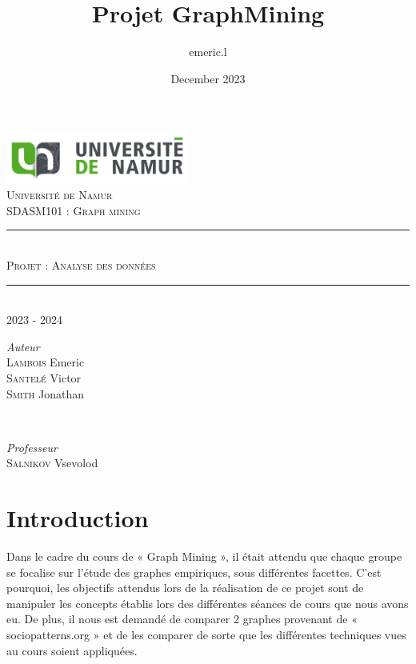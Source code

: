 \documentclass{article}
\title{Projet GraphMining}
\author{emeric.l }
\date{December 2023}
\begin{document}
\begin{titlepage}
\newcommand{\HRule}{\rule{\linewidth}{0.5mm}}
\center

\includegraphics[width=6cm]{assets/logo_unamur}
\\[2cm]

\textsc{\LARGE Université de Namur}
\\[2cm]

\textsc{\Large SDASM101 : Graph mining }
\\[0.2cm]

\HRule
\\[0.4cm]
\textsc{\huge Projet : Analyse des données}
\\[0.2cm]
\HRule
\\[0.4cm]
{\large 2023 - 2024}

\begin{minipage}{0.5\textwidth}
	\begin{flushleft}
		\emph{Auteur}
		\\
		\textsc{Lambois} Emeric
		\\
		\textsc{Santelé} Victor
		\\
		\textsc{Smith} Jonathan
		\\
	\end{flushleft}
\end{minipage}
~
\begin{minipage}{0.4\textwidth}
	\begin{flushright}
		\emph{Professeur}
		\\
		\textsc{Salnikov} Vsevolod
		\\
	\end{flushright}
\end{minipage}

\end{titlepage}

\tableofcontents
\newpage

\section{Introduction}
Dans le cadre du cours de « Graph Mining », il était attendu que chaque groupe se focalise sur l’étude des graphes empiriques, sous différentes facettes. C’est pourquoi, les objectifs attendus lors de la réalisation de ce projet sont de manipuler les concepts établis lors des différentes séances de cours que nous avons eu. De plus, il nous est demandé de comparer 2 graphes provenant de « sociopatterns.org » et de les comparer de sorte que les différentes techniques vues au cours soient appliquées.
\end{document}
